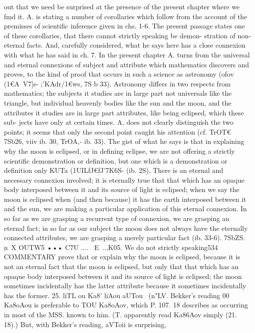 {{{{{{{{{out that we need be surprised at the presence of the present
chapter where we fmd it. A. is stating a number of corollaries
which follow from the account of the premisses of scientific
inference given in chs. 1-6. The present passage states one of
these corollaries, that there cannot strictly speaking be demon-
stration of non-eternal facts. And, carefully considered, what he
says here has a close connexion with what he has said in ch. 7.
In the present chapter A. turns from the universal and eternal
connexions of subject and attribute which mathematics discovers
and proves, to the kind of proof that occurs in such a science as
astronomy (ofov (1€A~V7]s- ;'KAdr/1€ws, 7S b 33). Astronomy differs in
two respects from mathematics; the subjects it studies are in
large part not universals like the triangle, but individual heavenly
bodies like the sun and the moon, and the attributes it studies
are in large part attributes, like being eclipsed, which these sub-
jects have only at certain times. A. does not clearly distinguish
the two points; it seems that only the second point caught his
attention (cf. TrOT€ 7Sb26, viiv ib. 30, TrOA,\dKLS- ib. 33). The gist
of what he says is that in explaining why the moon is eclipsed,
or in defining eclipse, we are not offering a strictly scientific
demonstration or definition, but one which is a demonstration
or definition only KUTa (1UILfJ€fJ'7K6S- (ib. 2S). There is an eternal
and necessary connexion involved; it is eternally true that that
which has an opaque body interposed between it and its source
of light is eclipsed; when we say the moon is eclipsed when (and
then because) it has the earth interposed between it and the sun,
we are making a particular application of this eternal connexion.
In so far as we are grasping a recurrent type of connexion, we
are grasping an eternal fact; in so far as our subject the moon
does not always have the eternally connected attributes, we are
grasping a merely particular fact (ib. 33-6).
7SbZS. n~X OUTW5 ••• C7U .... ~E~..,K05. We do not strictly speaking534
COMMENTARY
prove that or explain why the moon is eclipsed, because it
is not an eternal fact that the moon is eclipsed, but only that
that which has an opaque body interposed between it and its
source of light is eclipsed; the moon sometimes incidentally
has the latter attribute because it sometimes incidentally has
the former.
25. liTL ou Ka8' liAou aUTou ~(n"LV. Bekker's reading 00 Ka8oAou
is preferable to TOU Ka8oAov, which P. 107. 18 describes as occurring
in most of the MSS. known to him. (T. apparently read Ka86Aov
simply (21. 18).) But, with Bekker's reading, aVToii is surprising,
}}}}}}}}}
